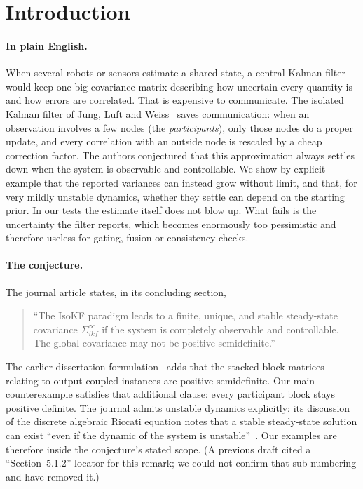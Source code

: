 \documentclass[11pt,a4paper]{article}
\numberwithin{equation}{section}
\theoremstyle{remark}\newtheorem{remark}[theorem]{Remark}
\begin{document}
\tableofcontents

\section{Introduction}\label{sec:intro}

\paragraph{In plain English.}
When several robots or sensors estimate a shared state, a central Kalman filter would keep one
big covariance matrix describing how uncertain every quantity is and how errors are
correlated. That is expensive to communicate. The isolated Kalman filter of Jung, Luft and
Weiss~\citep{JungLuftWeiss2025} saves communication: when an observation involves a few nodes
(the \emph{participants}), only those nodes do a proper update, and every correlation with an
outside node is rescaled by a cheap correction factor. The authors conjectured that this
approximation always settles down when the system is observable and controllable. We show by
explicit example that the reported variances can instead grow without limit, and that, for
very mildly unstable dynamics, whether they settle can depend on the starting prior. In our
tests the estimate itself does not blow up. What fails is the uncertainty the filter reports,
which becomes enormously too pessimistic and therefore useless for gating, fusion or
consistency checks.

\paragraph{The conjecture.} The journal article states, in its concluding section,
\begin{quote}
``The IsoKF paradigm leads to a finite, unique, and stable steady-state covariance
$\Sigma_{ikf}^{\infty}$ if the system is completely observable and controllable. The global
covariance may not be positive semidefinite.'' \citep[Conjecture~1]{JungLuftWeiss2025}
\end{quote}
The earlier dissertation formulation~\citep[printed p.~162]{Jung2023thesis} adds that the
stacked block matrices relating to output-coupled instances are positive semidefinite. Our
main counterexample satisfies that additional clause: every participant block stays positive
definite. The journal admits unstable dynamics explicitly: its discussion of the discrete
algebraic Riccati equation notes that a stable steady-state solution can exist ``even if the
dynamic of the system is unstable''~\citep{JungLuftWeiss2025}. Our examples are therefore
inside the conjecture's stated scope. (A previous draft cited a ``Section~5.1.2'' locator for
this remark; we could not confirm that sub-numbering and have removed it.)
\end{document}
